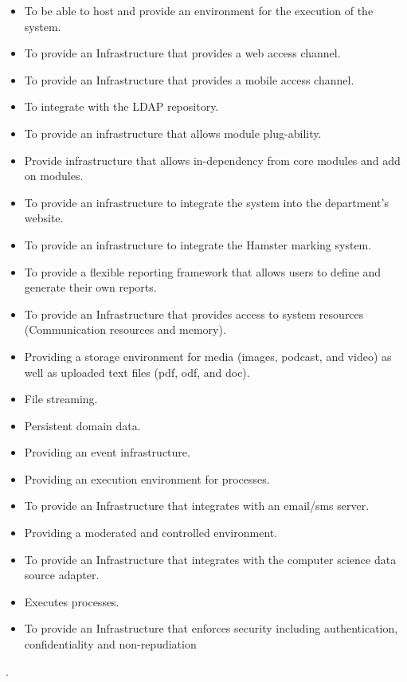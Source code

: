 \documentclass[11pt]{article}
\begin{document}
	\begin{itemize}
	\item To be able to host and provide an environment for the execution of the system.
	
	\item To provide an Infrastructure that provides a web access channel.
	
	\item To provide an Infrastructure that provides a mobile access channel.
	
	\item To integrate with the LDAP repository.
	
	\item To provide an infrastructure that allows module plug-ability.
	
	\item Provide infrastructure that allows in-dependency from core modules and add on modules.
	
	\item To provide an infrastructure to integrate the system into the department's website.
	
	\item To provide an infrastructure to integrate the Hamster marking system.
	
	\item To provide a flexible reporting framework that allows users to define and generate their own reports.
	
	\item To provide an Infrastructure that provides access to system resources (Communication resources and memory).
	
	\item Providing a storage environment for media (images, podcast, and video) as well as uploaded text files (pdf, odf, and doc).
	
	\item File streaming.
	
	\item Persistent domain data.
	
	\item Providing an event infrastructure.
	
	\item Providing an execution environment for processes.
	
	\item To provide an Infrastructure that integrates with an email/sms server.
	
	\item Providing a moderated and controlled environment.
	
	\item To provide an Infrastructure that integrates with the computer science data source adapter.
	
	\item Executes processes.
	
	\item To provide an Infrastructure that enforces security including authentication, confidentiality and non-repudiation
	\end{itemize}.
\end{document}
